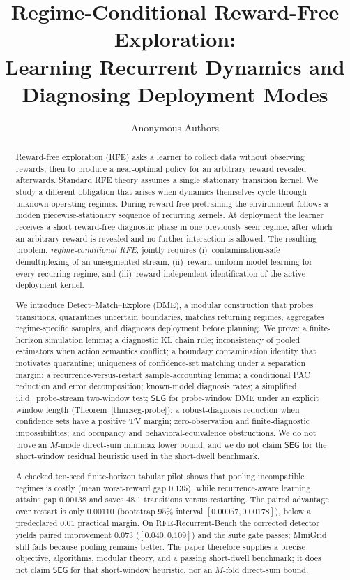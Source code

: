 \documentclass[11pt]{article}
\title{Regime-Conditional Reward-Free Exploration:\\
Learning Recurrent Dynamics and Diagnosing Deployment Modes}
\author{Anonymous Authors}
\date{}
\newcommand{\SEG}{\mathsf{SEG}}
\newcommand{\DME}{\textsc{DME}}
\begin{document}
\maketitle

\begin{abstract}
Reward-free exploration (RFE) asks a learner to collect data without observing
rewards, then to produce a near-optimal policy for an arbitrary reward revealed
afterwards. Standard RFE theory assumes a single stationary transition kernel.
We study a different obligation that arises when dynamics themselves cycle
through unknown operating regimes. During reward-free pretraining the
environment follows a hidden piecewise-stationary sequence of recurring
kernels. At deployment the learner receives a short reward-free diagnostic
phase in one previously seen regime, after which an arbitrary reward is
revealed and no further interaction is allowed. The resulting problem,
\emph{regime-conditional RFE}, jointly requires (i)~contamination-safe
demultiplexing of an unsegmented stream, (ii)~reward-uniform model learning
for every recurring regime, and (iii)~reward-independent identification of
the active deployment kernel.

We introduce Detect--Match--Explore (\DME), a modular construction that probes
transitions, quarantines uncertain boundaries, matches returning regimes,
aggregates regime-specific samples, and diagnoses deployment before planning.
We prove: a finite-horizon simulation lemma; a diagnostic KL chain rule;
inconsistency of pooled estimators when action semantics conflict; a boundary
contamination identity that motivates quarantine; uniqueness of
confidence-set matching under a separation margin; a recurrence-versus-restart
sample-accounting lemma; a conditional PAC reduction and error decomposition;
known-model diagnosis rates; a simplified i.i.d.\ probe-stream two-window
test; $\SEG$ for probe-window \DME{} under an explicit window length
(Theorem~\ref{thm:seg-probe}); a robust-diagnosis reduction when confidence
sets have a positive TV margin; zero-observation and finite-diagnostic
impossibilities; and occupancy and behavioral-equivalence obstructions. We do
not prove an $M$-mode direct-sum minimax lower bound, and we do not claim
$\SEG$ for the short-window residual heuristic used in the short-dwell
benchmark.

A checked ten-seed finite-horizon tabular pilot shows that pooling incompatible
regimes is costly (mean worst-reward gap $0.135$), while recurrence-aware
learning attains gap $0.00138$ and saves $48.1$ transitions versus restarting.
The paired advantage over restart is only $0.00110$ (bootstrap $95\%$ interval
$[0.00057,0.00178]$), below a predeclared $0.01$ practical margin. On
RFE-Recurrent-Bench the corrected detector yields paired improvement $0.073$
($[0.040,0.109]$) and the suite gate passes; MiniGrid still fails because
pooling remains better. The paper therefore supplies a precise objective,
algorithms, modular theory, and a passing short-dwell benchmark; it does not
claim $\SEG$ for that short-window heuristic, nor an $M$-fold direct-sum bound.
\end{abstract}
\end{document}
